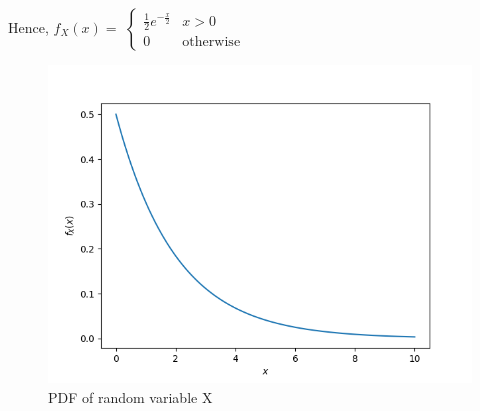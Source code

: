 \documentclass[journal,12pt,twocolumn]{IEEEtran}
\begin{document}
  Hence,
  $f_X(x)=$
$\begin{cases}
\frac{1}{2}e^{-\frac{x}{2}} & x>0\\
0 & \mathrm{otherwise}
\end{cases}$
\begin{figure}[h]
\begin{center}
\includegraphics[scale=0.16]{Figure_1.png}
\end{center}
\caption{PDF of random variable X}\label{fig1}
\end{figure}
\end{document}
